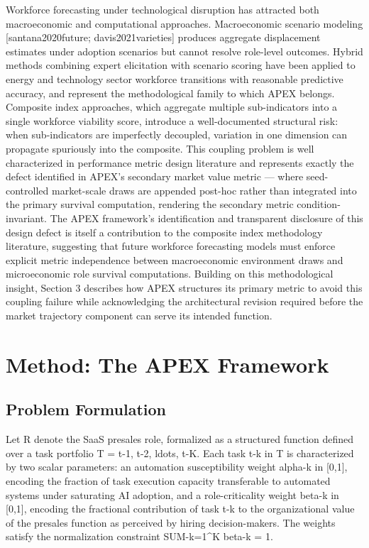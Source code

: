 \documentclass[10pt, conference]{IEEEtran}
\begin{document}
Workforce forecasting under technological disruption has attracted both macroeconomic and computational approaches. Macroeconomic scenario modeling [santana2020future; davis2021varieties] produces aggregate displacement estimates under adoption scenarios but cannot resolve role-level outcomes. Hybrid methods combining expert elicitation with scenario scoring \cite{wiser2021expert} have been applied to energy and technology sector workforce transitions with reasonable predictive accuracy, and represent the methodological family to which APEX belongs. Composite index approaches, which aggregate multiple sub-indicators into a single workforce viability score, introduce a well-documented structural risk: when sub-indicators are imperfectly decoupled, variation in one dimension can propagate spuriously into the composite. This coupling problem is well characterized in performance metric design literature \cite{virtanen2020scipy} and represents exactly the defect identified in APEX's secondary market value metric --- where seed-controlled market-scale draws are appended post-hoc rather than integrated into the primary survival computation, rendering the secondary metric condition-invariant. The APEX framework's identification and transparent disclosure of this design defect is itself a contribution to the composite index methodology literature, suggesting that future workforce forecasting models must enforce explicit metric independence between macroeconomic environment draws and microeconomic role survival computations. Building on this methodological insight, Section 3 describes how APEX structures its primary metric to avoid this coupling failure while acknowledging the architectural revision required before the market trajectory component can serve its intended function.

\section{Method: The APEX Framework}

\label{sec:method_the_apex_framework}

\subsection{Problem Formulation}

\label{sec:problem_formulation}

Let R denote the SaaS presales role, formalized as a structured function defined over a task portfolio T = t-1, t-2, ldots, t-K. Each task t-k in T is characterized by two scalar parameters: an automation susceptibility weight alpha-k in [0,1], encoding the fraction of task execution capacity transferable to automated systems under saturating AI adoption, and a role-criticality weight beta-k in [0,1], encoding the fractional contribution of task t-k to the organizational value of the presales function as perceived by hiring decision-makers. The weights satisfy the normalization constraint SUM-k=1\textasciicircum{}K beta-k = 1.
\end{document}
